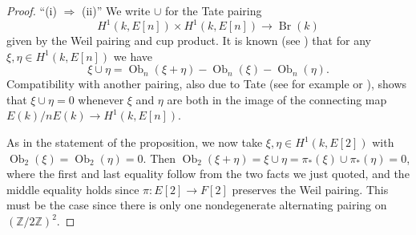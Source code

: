\documentclass[12pt]{amsart}
\newcommand{\Br}{\operatorname{Br}}
\newcommand{\Ob}{\operatorname{Ob}}
\newcommand{\Z}{{\mathbb Z}}
\theoremstyle{definition}
\begin{document}
\begin{proof}
  ``(i) $\Rightarrow$ (ii)'' We write $\cup$ for the Tate pairing
  \[ H^1(k,E[n]) \times H^1(k,E[n]) \to \Br(k) \] given by the Weil
  pairing and cup product.  It is known (see \cite{ONeil,Zarhin}) that
  for any $\xi,\eta \in H^1(k,E[n])$ we have
  \[ \xi \cup \eta = \Ob_n(\xi + \eta) - \Ob_n(\xi) - \Ob_n(\eta). \]
  Compatibility with another pairing, also due to Tate (see for example
  \cite[Proposition 2.1]{CTPPS} or \cite[Section 5]{ONeil}), shows
  that $\xi \cup \eta = 0$ whenever $\xi$ and $\eta$ are both in the
  image of the connecting map $E(k)/nE(k) \to H^1(k,E[n])$.

  As in the statement of the proposition, we now take
  $\xi,\eta \in H^1(k,E[2])$ with $\Ob_2(\xi) = \Ob_2(\eta) = 0$.
  Then
  $\Ob_2(\xi+\eta) = \xi \cup \eta = \pi_*(\xi) \cup \pi_*(\eta) = 0$,
  where the first and last equality follow from the two facts we just
  quoted, and the middle equality holds since $\pi : E[2] \to F[2]$
  preserves the Weil pairing.  This must be the case since there is
  only one nondegenerate alternating pairing on $(\Z/2\Z)^2$.
  

\end{proof}
\end{document}

